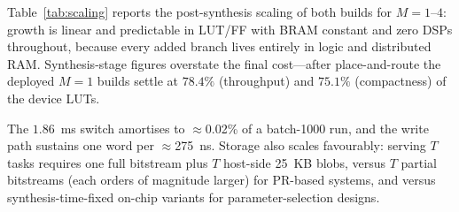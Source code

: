 \documentclass[journal]{IEEEtran}
\begin{document}
Table~\ref{tab:scaling} reports the post-synthesis scaling of both builds for $M{=}1$--$4$: growth is linear and predictable in LUT/FF with BRAM constant and zero DSPs throughout, because every added branch lives entirely in logic and distributed RAM. Synthesis-stage figures overstate the final cost---after place-and-route the deployed $M{=}1$ builds settle at $78.4\%$ (throughput) and $75.1\%$ (compactness) of the device LUTs.

The $1.86$~ms switch amortises to $\approx$0.02\% of a batch-1000 run, and the write path sustains one word per $\approx$275~ns. Storage also scales favourably: serving $T$ tasks requires one full bitstream plus $T$ host-side 25~KB blobs, versus $T$ partial bitstreams (each orders of magnitude larger) for PR-based systems, and versus synthesis-time-fixed on-chip variants for parameter-selection designs.

\begin{table}[!t]
\centering
\caption{Post-synthesis resource and power scaling of multi-branch MARS on XC7Z020 (BRAM constant, zero DSP).}
\label{tab:scaling}
\small
{}
\end{table}
\end{document}
